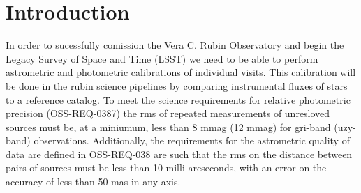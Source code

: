 \section{Introduction}
In order to sucessfully comission the Vera C. Rubin Observatory and begin the Legacy Survey of Space and Time (LSST) we need to be able to perform astrometric and photometric calibrations of individual visits. 
This calibration will be done in the rubin science pipelines by comparing instrumental fluxes of stars to a reference catalog.
To meet the science requirements for relative photometric precision (OSS-REQ-0387) the rms of repeated measurements of unresloved sources must be, at a miniumum, less than 8 mmag (12 mmag) for gri-band (uzy-band) observations. 
Additionally, the requirements for the astrometric quality of data are defined in OSS-REQ-038 are such that the rms on the distance between pairs of sources must be less than 10 milli-arcseconds, with an error on the accuracy of less than 50 mas in any axis. 